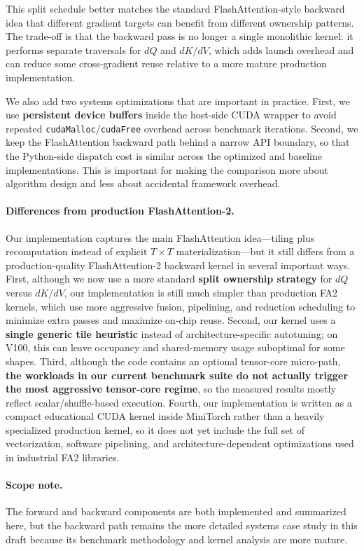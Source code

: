 \documentclass{article}
\begin{document}
This split schedule better matches the standard FlashAttention-style backward idea that different gradient targets can benefit from different ownership patterns. The trade-off is that the backward pass is no longer a single monolithic kernel: it performs separate traversals for $dQ$ and $dK/dV$, which adds launch overhead and can reduce some cross-gradient reuse relative to a more mature production implementation.

We also add two systems optimizations that are important in practice. First, we use \textbf{persistent device buffers} inside the host-side CUDA wrapper to avoid repeated \texttt{cudaMalloc}/\texttt{cudaFree} overhead across benchmark iterations. Second, we keep the FlashAttention backward path behind a narrow API boundary, so that the Python-side dispatch cost is similar across the optimized and baseline implementations. This is important for making the comparison more about algorithm design and less about accidental framework overhead.

\paragraph{Differences from production FlashAttention-2.} Our implementation captures the main FlashAttention idea---tiling plus recomputation instead of explicit $T \times T$ materialization---but it still differs from a production-quality FlashAttention-2 backward kernel in several important ways. First, although we now use a more standard \textbf{split ownership strategy} for $dQ$ versus $dK/dV$, our implementation is still much simpler than production FA2 kernels, which use more aggressive fusion, pipelining, and reduction scheduling to minimize extra passes and maximize on-chip reuse. Second, our kernel uses a \textbf{single generic tile heuristic} instead of architecture-specific autotuning; on V100, this can leave occupancy and shared-memory usage suboptimal for some shapes. Third, although the code contains an optional tensor-core micro-path, \textbf{the workloads in our current benchmark suite do not actually trigger the most aggressive tensor-core regime}, so the measured results mostly reflect scalar/shuffle-based execution. Fourth, our implementation is written as a compact educational CUDA kernel inside MiniTorch rather than a heavily specialized production kernel, so it does not yet include the full set of vectorization, software pipelining, and architecture-dependent optimizations used in industrial FA2 libraries.

\paragraph{Scope note.} The forward and backward components are both implemented and summarized here, but the backward path remains the more detailed systems case study in this draft because its benchmark methodology and kernel analysis are more mature.
\end{document}
